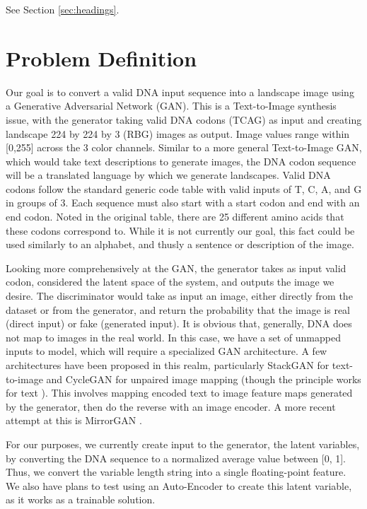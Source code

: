 \documentclass{article}
\begin{document}
	See Section \ref{sec:headings}.
	
	
	\section{Problem Definition}
	\label{sec:others}
	Our goal is to convert a valid DNA input sequence into a landscape image using a Generative Adversarial Network (GAN). This is a Text-to-Image synthesis issue, with the generator taking valid DNA codons (TCAG) as input and creating landscape 224 by 224 by 3 (RBG) images as output. Image values range within [0,255] across the 3 color channels. Similar to a more general Text-to-Image GAN, which would take text descriptions to generate images, the DNA codon sequence will be a translated language by which we generate landscapes. Valid DNA codons follow the standard generic code table with valid inputs of T, C, A, and G in groups of 3. Each sequence must also start with a start codon and end with an end codon. Noted in the original table, there are 25 different amino acids that these codons correspond to. While it is not currently our goal, this fact could be used similarly to an alphabet, and thusly a sentence or description of the image. 
	
	Looking more comprehensively at the GAN, the generator takes as input valid codon, considered the latent space of the system, and outputs the image we desire. The discriminator would take as input an image, either directly from the dataset or from the generator, and return the probability that the image is real (direct input) or fake (generated input). It is obvious that, generally, DNA does not map to images in the real world. In this case, we have a set of unmapped inputs to model, which will require a specialized GAN architecture. A few architectures have been proposed in this realm, particularly StackGAN \cite{hadash2018estimate} for text-to-image and CycleGAN \cite{kour2014real,kour2014fast} for unpaired image mapping (though the principle works for text \cite{hadash2018estimate}). This involves mapping encoded text to image feature maps generated by the generator, then do the reverse with an image encoder. A more recent attempt at this is MirrorGAN \cite{hadash2018estimate}.  
	
	For our purposes, we currently create input to the generator, the latent variables, by converting the DNA sequence to a normalized average value between [0, 1]. Thus, we convert the variable length string into a single floating-point feature. We also have plans to test using an Auto-Encoder to create this latent variable, as it works as a trainable solution. 
	
\end{document}
